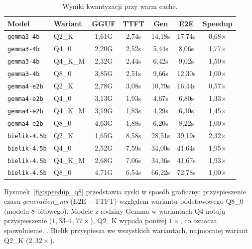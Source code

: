 \begin{table}[H]
  \centering
  \caption{Wyniki kwantyzacji przy warm cache.}
  \label{tab:kwantyzacja_wyniki}
  \small
  \begin{tabular}{llccccc}
    \hline
    Model & Wariant & GGUF & TTFT & Gen & E2E & Speedup \\
    \hline
    \texttt{gemma3-4b}  & Q2\_K   & 1{,}61G & 2{,}74s & 14{,}18s & 17{,}74s & 0{,}68$\times$ \\
    \texttt{gemma3-4b}  & Q4\_0   & 2{,}20G & 2{,}52s & 5{,}44s  & 8{,}06s  & 1{,}77$\times$ \\
    \texttt{gemma3-4b}  & Q4\_K\_M& 2{,}32G & 2{,}44s & 6{,}42s  & 9{,}02s  & 1{,}50$\times$ \\
    \texttt{gemma3-4b}  & Q8\_0   & 3{,}85G & 2{,}51s & 9{,}66s  & 12{,}30s & 1{,}00$\times$ \\
    \texttt{gemma4-e2b} & Q2\_K   & 2{,}78G & 3{,}08s & 10{,}79s & 16{,}44s & 0{,}57$\times$ \\
    \texttt{gemma4-e2b} & Q4\_0   & 3{,}13G & 1{,}93s & 4{,}67s  & 6{,}80s  & 1{,}33$\times$ \\
    \texttt{gemma4-e2b} & Q4\_K\_M& 3{,}19G & 1{,}83s & 4{,}29s  & 6{,}30s  & 1{,}45$\times$ \\
    \texttt{gemma4-e2b} & Q8\_0   & 4{,}63G & 1{,}88s & 6{,}20s  & 8{,}22s  & 1{,}00$\times$ \\
    \texttt{bielik-4.5b}& Q2\_K   & 1{,}65G & 8{,}58s & 28{,}51s & 39{,}19s & 2{,}32$\times$ \\
    \texttt{bielik-4.5b}& Q4\_0   & 2{,}52G & 7{,}59s & 34{,}00s & 41{,}64s & 1{,}95$\times$ \\
    \texttt{bielik-4.5b}& Q4\_K\_M& 2{,}68G & 7{,}06s & 34{,}36s & 41{,}67s & 1{,}93$\times$ \\
    \texttt{bielik-4.5b}& Q8\_0   & 4{,}71G & 6{,}54s & 66{,}22s & 72{,}78s & 1{,}00$\times$ \\
    \hline
  \end{tabular}
\end{table}

Rysunek~\ref{fig:speedup_q8} przedstawia zyski w sposób graficzny:
przyspieszenie czasu \emph{generation\_ms}
($\mathrm{E2E}-\mathrm{TTFT}$) względem wariantu podstawowego Q8\_0
(modelu 8-bitowego). Modele z rodziny Gemma w wariantach Q4 notują przyspieszenie 
($1{,}33$--$1{,}77\times$), Q2\_K wypada poniżej $1\times$, co oznacza spowolnienie.
. Bielik przyspiesza we wszystkich wariantach,
najmocniej wariant Q2\_K ($2{,}32\times$).

